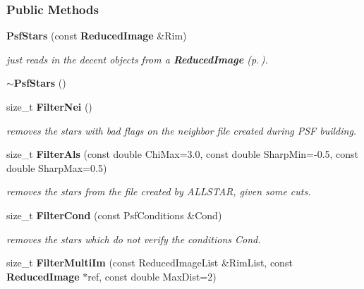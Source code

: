 \subsubsection*{Public Methods}
\begin{CompactItemize}
\item 
{}
{\bf Psf\-Stars} (const {\bf Reduced\-Image} \&Rim)\label{class_psfstars_a0}

\begin{CompactList}\small\item\em just reads in the decent objects from a {\bf Reduced\-Image} {\rm (p.\,\pageref{class_reducedimage})}.\item\end{CompactList}\item 
{}
{\bf $\sim$Psf\-Stars} ()\label{class_psfstars_a1}

\item 
{}
size\_\-t {\bf Filter\-Nei} ()\label{class_psfstars_a2}

\begin{CompactList}\small\item\em removes the stars with bad flags on the neighbor file created during PSF building.\item\end{CompactList}\item 
{}
size\_\-t {\bf Filter\-Als} (const double Chi\-Max=3.0, const double Sharp\-Min=-0.5, const double Sharp\-Max=0.5)\label{class_psfstars_a3}

\begin{CompactList}\small\item\em removes the stars from the file created by ALLSTAR, given some cuts.\item\end{CompactList}\item 
{}
size\_\-t {\bf Filter\-Cond} (const Psf\-Conditions \&Cond)\label{class_psfstars_a4}

\begin{CompactList}\small\item\em removes the stars which do not verify the conditions Cond.\item\end{CompactList}\item 
{}
size\_\-t {\bf Filter\-Multi\-Im} (const Reduced\-Image\-List \&Rim\-List, const {\bf Reduced\-Image} $\ast$ref, const double Max\-Dist=2)\label{class_psfstars_a5}


\end{CompactItemize}
